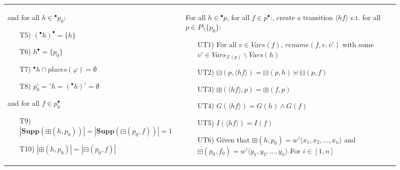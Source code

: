 \begin{figure}[h!]
\begin{adjustbox}{center}
\begin{tabular}{|p{70mm}|p{70mm}|}
\begin{itemize}[leftmargin=9mm]
        \end{itemize}
        \hspace{2mm}
        and for all $h\in{}^\bullet p_0$:
        \begin{itemize}[leftmargin=9mm]
            \item[T5)] $(^\bullet h)^\bullet = \{h\}$
            \item[T6)] $h^\bullet=\{p_0\}$
            \item[T7)] ${}^\bullet h \cap places(\varphi) = \emptyset$
            \item[T8)] $p_0^\circ = {}^\circ h = ({}^\bullet h)^\circ = \emptyset$
        \end{itemize}
        \hspace{2mm}
        and for all $f\in p_0^\bullet$
        \begin{itemize}[leftmargin=11mm]
            \item[T9)] $|\textbf{Supp}(\boxplus(h, p_0))| = |\textbf{Supp}(\boxminus(p_0, f))| = 1$
            \item[T10)] $|\boxplus(h, p_0)| = |\boxminus(p_0,f)|$
        \end{itemize}
        &
        For all $h\in{}^\bullet p$, for all $f\in p^\bullet$:, create a transition $\langle hf\rangle$ s.t. for all $p\in P\setminus\{p_0\}$:
        \begin{itemize}[leftmargin=10mm]
            \item[UT1)] For all $v \in Vars(f)$, $rename(f,v,v')$ with some $v' \in Vars_{\mathcal{X}(p)}\backslash Vars(h)$
            \item[UT2)] $\boxminus(p,\langle hf\rangle)= \boxminus(p,h)\uplus\boxminus(p,f)$
            \item[UT3)] $\boxplus(\langle hf\rangle,p)= \boxplus(f,p)$
            \item[UT4)] $G(\langle hf\rangle) = G(h) \land G(f)$
            \item[UT5)] $I(\langle hf\rangle) = I(f)$
            \item[UT6)] Given that $\boxplus(h,p_0) = w{}'\langle x_1, x_2, \dots, x_n \rangle$ and $\boxminus(p_0, f_0) = w{}'\langle y_1, y_2, \dots, y_n \rangle$\newline
            For $i\in[1,n]$\newline

\end{itemize}
\end{tabular}
\end{adjustbox}
\end{figure}

